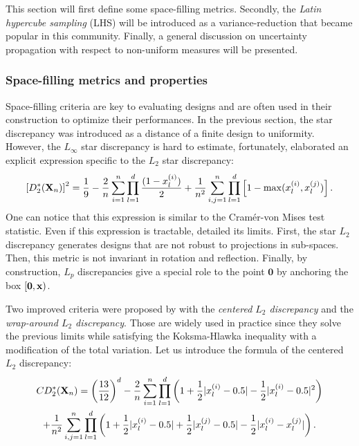 This section will first define some space-filling metrics.
Secondly, the \textit{Latin hypercube sampling} (LHS) will be introduced as a variance-reduction that became popular in this community. 
Finally, a general discussion on uncertainty propagation with respect to non-uniform measures will be presented.

\subsubsection{Space-filling metrics and properties}
Space-filling criteria are key to evaluating designs and are often used in their construction to optimize their performances. 
In the previous section, the star discrepancy was introduced as a distance of a finite design to uniformity.
However, the $L_\infty$ star discrepancy is hard to estimate, fortunately, \citet{warnock_1972} elaborated an explicit expression specific to the $L_2$ star discrepancy: 
\begin{equation}
    \left[D^*_2({\bf X}_n)\right]^2 = \frac19 - \frac2n \sum_{i=1}^{n} \prod_{l=1}^{d} \frac{(1-x_l^{(i)})}{2} + \frac{1}{n^2}\sum_{i,j=1}^{n} \prod_{l=1}^{d} \left[1 - \max(x_l^{(i)}, x_l^{(j)})\right].
\end{equation}
One can notice that this expression is similar to the Cramér-von Mises test statistic. 
Even if this expression is tractable, \citet{fang_liu_2018} detailed its limits. 
First, the star $L_2$ discrepancy generates designs that are not robust to projections in sub-spaces. 
Then, this metric is not invariant in rotation and reflection. 
Finally, by construction, $L_p$ discrepancies give a special role to the point $\mathbf{0}$ by anchoring the box $[\mathbf{0}, {\bf x})$.

Two improved criteria were proposed by \citet{hickernell_1998} with the \textit{centered $L_2$ discrepancy} and the \textit{wrap-around $L_2$ discrepancy}.
Those are widely used in practice since they solve the previous limits while satisfying the Koksma-Hlawka inequality with a modification of the total variation.
Let us introduce the formula of the centered $L_2$ discrepancy:
\begin{multline} CD^*_2({\bf X}_n)  = \left(\frac{13}{12}\right)^{d} - \frac{2}{n} \sum_{i=1}^{n} \prod_{l=1}^{d} \left( 1 + \frac{1}{2} |x_l^{(i)} - 0.5| - \frac{1}{2} |x_l^{(i)} - 0.5|^2 \right)\\
    + \frac{1}{n^2} \sum_{i,j=1}^{n} \prod_{l=1}^{d} \left( 1 + \frac{1}{2} |x_l^{(i)} - 0.5| + \frac{1}{2} |x_l^{(j)} - 0.5| - \frac{1}{2} |x_l^{(i)} - x_l^{(j)}| \right).
\end{multline}

